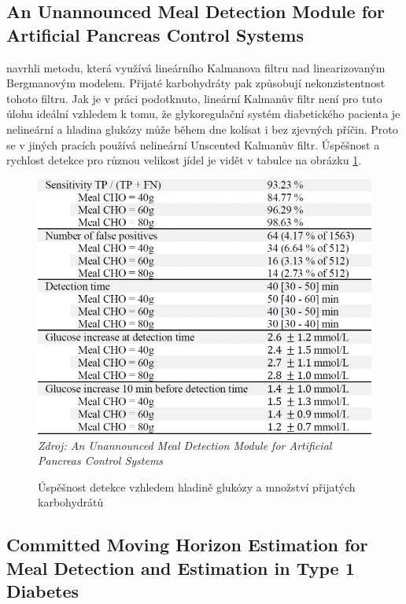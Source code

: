 \subsection{An Unannounced Meal Detection Module for Artificial Pancreas Control Systems}
\label{ch:nekonzistence}

\citet{Analyza.Nekonzistence} navrhli metodu, která využívá lineárního Kalmanova filtru nad linearizovaným Bergmanovým modelem. Přijaté karbohydráty pak způsobují nekonzistentnost tohoto filtru. Jak je v práci podotknuto, lineární Kalmanův filtr není pro tuto úlohu ideální vzhledem k tomu, že glykoregulační systém diabetického pacienta je nelineární a hladina glukózy může během dne kolísat i bez zjevných příčin. Proto se v jiných pracích používá nelineární Unscented Kalmanův filtr. Úspěšnost a rychlost detekce pro různou velikost jídel je vidět v tabulce na obrázku \ref{fig:nekonzistence}.

\begin{figure}[H]
\caption{Úspěšnost detekce vzhledem hladině glukózy a množství přijatých karbohydrátů}
\label{fig:nekonzistence}
\includegraphics[width=1\textwidth]{img/analyza/nekonzistence.png}\\
\textit{Zdroj: An Unannounced Meal Detection Module for Artificial Pancreas Control Systems \citep{Analyza.Nekonzistence}}
\end{figure}


\subsection{Committed Moving Horizon Estimation for Meal Detection and Estimation in Type 1 Diabetes}
\label{ch:horizon}

